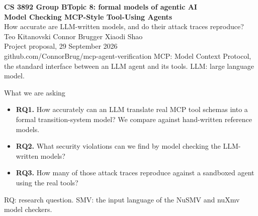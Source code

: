 \documentclass[aspectratio=169,11pt]{beamer}
\newcommand{\groupletter}{B}
\newcommand{\acro}[1]{\vfill{\color{muted}\scriptsize #1}}
\begin{document}
\begin{frame}[plain]
\vspace{2.2em}
{\color{accent}\small\bfseries CS 3892 \quad Group \groupletter \quad Topic 8: formal models of agentic AI}\\[0.8em]
{\LARGE\bfseries Model Checking MCP-Style Tool-Using Agents}\\[0.5em]
{\large\color{muted} How accurate are LLM-written models, and do their attack traces reproduce?}\\[2em]
{\large Teo Kitanovski \quad Connor Brugger \quad Xiaodi Shao}\\[0.4em]
{\small\color{muted} Project proposal, 29 September 2026}\\[0.4em]
{\small\ttfamily github.com/ConnorBrug/mcp-agent-verification}
\acro{MCP: Model Context Protocol, the standard interface between an LLM agent and its tools.
LLM: large language model.}
\end{frame}

\begin{frame}{What we are asking}
\centering
{}

\vspace{1em}
\raggedright
\begin{itemize}\setlength\itemsep{0.5em}
\item \textbf{RQ1.} How accurately can an LLM translate real MCP tool schemas into a formal
  transition-system model? We compare against hand-written reference models.
\item \textbf{RQ2.} What security violations can we find by model checking the LLM-written models?
\item \textbf{RQ3.} How many of those attack traces reproduce against a sandboxed agent using the
  real tools?
\end{itemize}
\acro{RQ: research question. SMV: the input language of the NuSMV and nuXmv model checkers.}
\end{frame}
\end{document}
